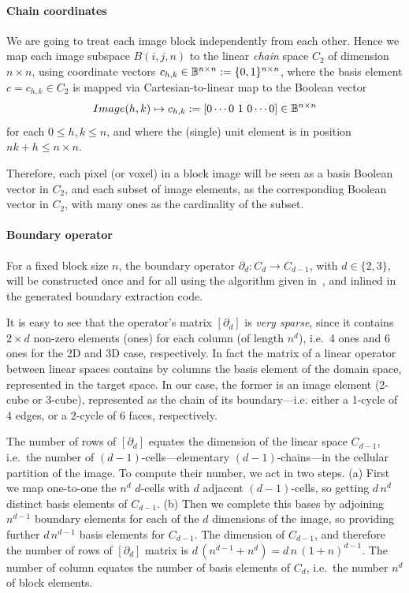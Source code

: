 \paragraph{Chain coordinates }\label{sec:bbbb} 
We are going to treat each image block independently from each other. Hence we map each image subspace $B(i,j,n)$ to the linear \emph{chain} space $C_2$ of dimension $n\times n$, using coordinate vectors $c_{h,k}\in \mathbb{B}^{n\times n} := \{0,1\}^{n\times n}$, where the basis element $c = c_{h,k} \in C_2$ is mapped via Cartesian-to-linear map to the Boolean vector 
\[
Image(h,k) \mapsto c_{h,k} := [0 \cdots 0\ 1\ 0 \cdots 0] \in \mathbb{B}^{n\times n}
\]
for each $0\leq h,k \leq n$, and where the (single) unit element is in position $nk + h \leq n\times n$.

Therefore, each pixel (or voxel) in a block image will be seen as a basis Boolean vector in $C_2$, and each subset of image elements, as the corresponding Boolean vector in $C_2$, with many ones as the cardinality of the subset.

\paragraph{Boundary operator }\label{sec:bbbb} For a fixed block size $n$, the boundary operator $\partial_d : C_d\to C_{d-1}$, with $d\in\{2,3\}$, will be constructed once and for all using the algorithm given in~\cite{}, and inlined in the generated boundary extraction code.

It is easy to see that the operator's matrix $[\partial_d]$ is \emph{very sparse}, since it contains $2\times d$ non-zero elements (ones) for each column (of length $n^d$), i.e.~4 ones and 6 ones for the 2D and 3D case, respectively. In fact the matrix of a linear operator between linear spaces contains by columns the basis element of the domain space, represented in the target space. In our case, the former is an image element (2-cube or 3-cube), represented as the chain of its boundary---i.e. either a 1-cycle of 4 edges, or  a 2-cycle of 6 faces, respectively.  

The number of rows of $[\partial_d]$ equates the dimension of the linear space $C_{d-1}$, i.e.~the number of $(d-1)$-cells---elementary $(d-1)$-chains---in the cellular partition of the image. To compute their number, we act in two steps. (a) First we map one-to-one the $n^d$ $d$-cells with $d$ adjacent $(d-1)$-cells, so getting $d\,n^d$ distinct basis elements of $C_{d-1}$. (b) Then we complete this bases by adjoining $n^{d-1}$ boundary elements for each of the $d$ dimensions of the image, so providing further $d\,n^{d-1}$ basis elements for $C_{d-1}$. The dimension of $C_{d-1}$, and therefore the number of rows of $[\partial_d]$ matrix is $d\,(n^{d-1}+n^{d}) = d\,n\,(1+n)^{d-1}$. The number of column equates the number of basis elements of $C_d$, i.e.~the number $n^d$ of block elements.

